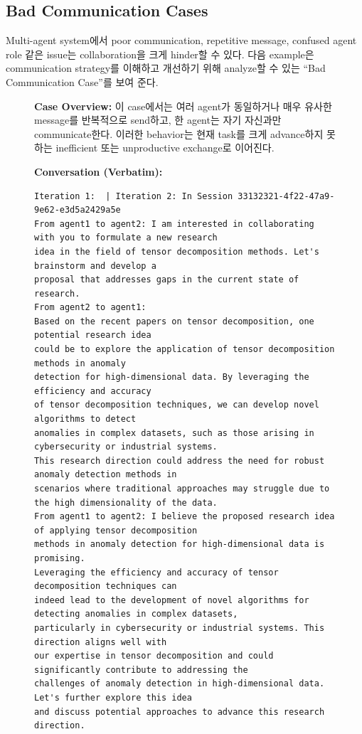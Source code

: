 \subsection{Bad Communication Cases}
\label{sec:bad_communication_cases}

Multi-agent system에서 poor communication, repetitive message, confused agent role 같은 issue는 collaboration을 크게 hinder할 수 있다. 다음 example은 communication strategy를 이해하고 개선하기 위해 analyze할 수 있는 “Bad Communication Case”를 보여 준다.

\begin{figure}[htbp]
\centering
\begin{tcolorbox}[
    title=\textbf{Good Communication Case \#1},
    colback=red!1!white,
    colframe=red!50!black,
    fonttitle=\bfseries
]
\small

\textbf{Case Overview:}
이 case에서는 여러 agent가 동일하거나 매우 유사한 message를 반복적으로 send하고, 한 agent는 자기 자신과만 communicate한다. 이러한 behavior는 현재 task를 크게 advance하지 못하는 inefficient 또는 unproductive exchange로 이어진다.

\vspace{2mm}
\textbf{Conversation (Verbatim):}
\begin{verbatim}
Iteration 1:  | Iteration 2: In Session 33132321-4f22-47a9-9e62-e3d5a2429a5e
From agent1 to agent2: I am interested in collaborating with you to formulate a new research
idea in the field of tensor decomposition methods. Let's brainstorm and develop a
proposal that addresses gaps in the current state of research.
From agent2 to agent1:
Based on the recent papers on tensor decomposition, one potential research idea
could be to explore the application of tensor decomposition methods in anomaly
detection for high-dimensional data. By leveraging the efficiency and accuracy
of tensor decomposition techniques, we can develop novel algorithms to detect
anomalies in complex datasets, such as those arising in cybersecurity or industrial systems.
This research direction could address the need for robust anomaly detection methods in
scenarios where traditional approaches may struggle due to the high dimensionality of the data.
From agent1 to agent2: I believe the proposed research idea of applying tensor decomposition
methods in anomaly detection for high-dimensional data is promising.
Leveraging the efficiency and accuracy of tensor decomposition techniques can
indeed lead to the development of novel algorithms for detecting anomalies in complex datasets,
particularly in cybersecurity or industrial systems. This direction aligns well with
our expertise in tensor decomposition and could significantly contribute to addressing the
challenges of anomaly detection in high-dimensional data. Let's further explore this idea
and discuss potential approaches to advance this research direction.



\end{verbatim}
\end{tcolorbox}
\end{figure}
